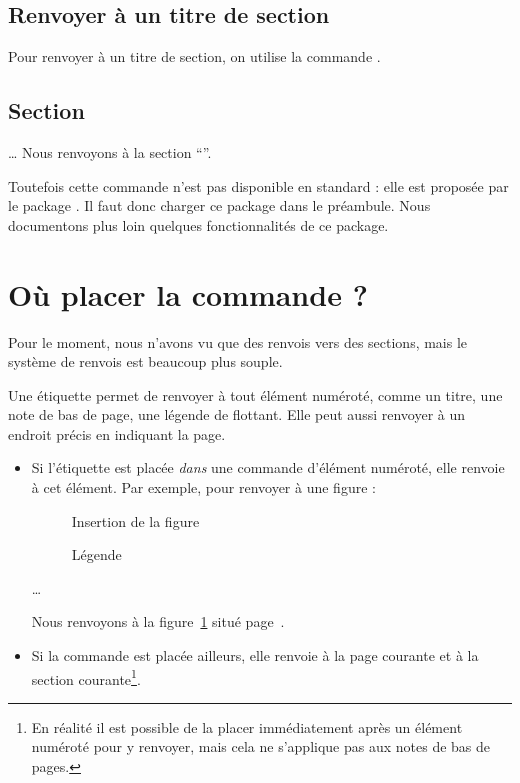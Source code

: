 \subsection{Renvoyer à un titre de section}\label{renvoititre}

Pour renvoyer à un titre de section, on utilise la commande .

\begin{latexcode}
\section{Section} \label{etiquette}
…
Nous renvoyons à la section  \enquote{}.
\end{latexcode}

Toutefois cette commande n'est pas disponible en standard : elle est proposée par le package . Il faut donc charger ce package dans le préambule. Nous documentons plus loin quelques fonctionnalités de ce package.


\section[Où placer la commande \oldcs{label} ?]{Où placer la commande  ?}

Pour le moment, nous n'avons vu que des renvois vers des sections, mais le système de renvois est beaucoup plus souple.

Une étiquette permet de renvoyer à tout élément numéroté, comme un titre, une note de bas de page, une légende de flottant. Elle peut aussi renvoyer à un endroit précis en indiquant la page.

\begin{itemize}
\item Si l'étiquette  est placée \emph{dans}  une commande  d'élément numéroté, elle renvoie à cet élément. Par exemple, pour renvoyer à une figure  :

\begin{latexcode}
\begin{figure}[paramètre de placement]
    Insertion de la figure
    \caption{Légende\label{figure}}
\end{figure} 
…

Nous renvoyons à la figure~\ref{figure} situé page~\pageref{figure}.
\end{latexcode}

\item Si la commande est placée ailleurs, elle renvoie à la page courante et à la section courante\footnote{En réalité il est possible de la placer immédiatement après un élément numéroté pour y renvoyer, mais cela ne s'applique pas aux notes de bas de pages.}.
\end{itemize}

